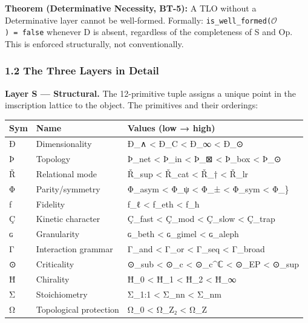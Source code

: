 \documentclass[
  11pt,
  a4paper,
]{article}
\newcounter{none} %
\begin{document}
\textbf{Theorem (Determinative Necessity, BT-5):} A TLO without a
Determinative layer cannot be well-formed. Formally:
\texttt{is\_well\_formed(\(\mathcal{O}\))\ =\ false} whenever D is absent, regardless
of the completeness of S and Op. This is enforced structurally, not
conventionally.

\subsubsection{1.2 The Three Layers in
Detail}\label{the-three-layers-in-detail}

\textbf{Layer S --- Structural.} The 12-primitive tuple assigns a unique
point in the imscription lattice to the object. The primitives and their
orderings:

{\def\LTcaptype{none} %
\begin{longtable}[]{@{}lll@{}}
\toprule\noalign{}
Sym & Name & Values (low → high) \\
\midrule\noalign{}
\endhead
\bottomrule\noalign{}
\endlastfoot
Ð & Dimensionality & Ð\_∧ \textless{} Ð\_C \textless{} Ð\_∞ \textless{}
Ð\_⊙ \\
Þ & Topology & Þ\_net \textless{} Þ\_in \textless{} Þ\_⊠ \textless{}
Þ\_box \textless{} Þ\_⊙ \\
Ř & Relational mode & Ř\_sup \textless{} Ř\_cat \textless{} Ř\_†
\textless{} Ř\_lr \\
Φ & Parity/symmetry & Φ\_asym \textless{} Φ\_ψ \textless{} Φ\_±
\textless{} Φ\_sym \textless{} Φ\_\} \\
ƒ & Fidelity & ƒ\_ℓ \textless{} ƒ\_eth \textless{} ƒ\_ħ \\
Ç & Kinetic character & Ç\_fast \textless{} Ç\_mod \textless{} Ç\_slow
\textless{} Ç\_trap \\
ɢ & Granularity & ɢ\_beth \textless{} ɢ\_gimel \textless{} ɢ\_aleph \\
Γ & Interaction grammar & Γ\_and \textless{} Γ\_or \textless{} Γ\_seq
\textless{} Γ\_broad \\
⊙ & Criticality & ⊙\_sub \textless{} ⊙\_c \textless{} ⊙\_c\^{}ℂ
\textless{} ⊙\_EP \textless{} ⊙\_sup \\
Ħ & Chirality & Ħ\_0 \textless{} Ħ\_1 \textless{} Ħ\_2 \textless{}
Ħ\_∞ \\
Σ & Stoichiometry & Σ\_1:1 \textless{} Σ\_nn \textless{} Σ\_nm \\
Ω & Topological protection & Ω\_0 \textless{} Ω\_Z₂ \textless{} Ω\_Z \\
\end{longtable}
}
\end{document}
